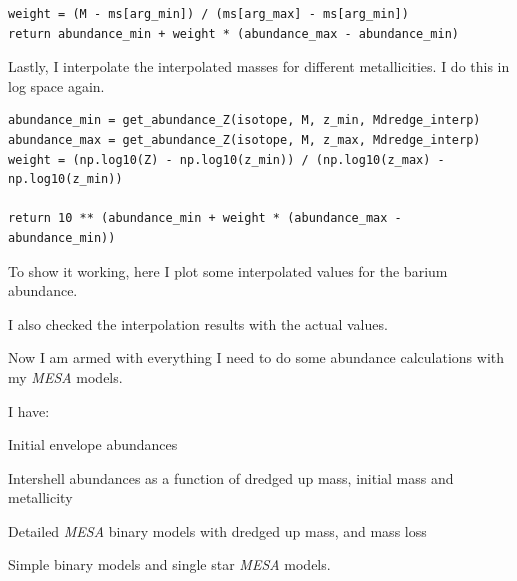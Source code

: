 \documentclass[a4paper,10pt]{article}
\begin{document}
\begin{verbatim}
weight = (M - ms[arg_min]) / (ms[arg_max] - ms[arg_min])
return abundance_min + weight * (abundance_max - abundance_min)
\end{verbatim}

Lastly, I interpolate the interpolated masses for different metallicities.
I do this in log space again.
\begin{verbatim}
abundance_min = get_abundance_Z(isotope, M, z_min, Mdredge_interp)
abundance_max = get_abundance_Z(isotope, M, z_max, Mdredge_interp)
weight = (np.log10(Z) - np.log10(z_min)) / (np.log10(z_max) - np.log10(z_min))

return 10 ** (abundance_min + weight * (abundance_max - abundance_min))
\end{verbatim}

To show it working, here I plot some interpolated values for the barium abundance.
\begin{figure}[ht]
    \centering
\end{figure}

\begin{figure}[ht]
    \centering
\end{figure}
I also checked the interpolation results with the actual values.
\begin{figure}[ht]
    \centering
\end{figure}



Now I am armed with everything I need to do some abundance calculations with my \emph{MESA} models. 

I have:
\begin{citemize}
    \item  Initial envelope abundances
    \item  Intershell abundances as a function of dredged up mass, initial mass and metallicity
    \item  Detailed \emph{MESA} binary models with dredged up mass, and mass loss
    \item  Simple binary models and single star \emph{MESA} models. 
\end{citemize}
\end{document}
